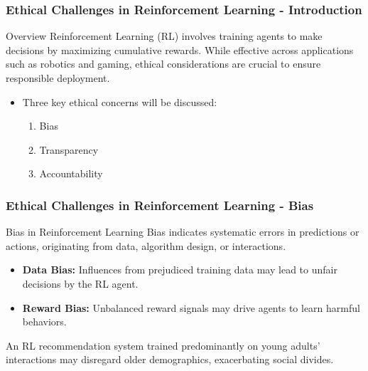 \documentclass[aspectratio=169]{beamer}
\begin{document}
\begin{frame}[fragile]
    \frametitle{Ethical Challenges in Reinforcement Learning - Introduction}
    \begin{block}{Overview}
        Reinforcement Learning (RL) involves training agents to make decisions by maximizing cumulative rewards. While effective across applications such as robotics and gaming, ethical considerations are crucial to ensure responsible deployment.
    \end{block}
    \begin{itemize}
        \item Three key ethical concerns will be discussed:
        \begin{enumerate}
            \item Bias
            \item Transparency
            \item Accountability
        \end{enumerate}
    \end{itemize}
\end{frame}

\begin{frame}[fragile]
    \frametitle{Ethical Challenges in Reinforcement Learning - Bias}
    \begin{block}{Bias in Reinforcement Learning}
        Bias indicates systematic errors in predictions or actions, originating from data, algorithm design, or interactions.
    \end{block}
    \begin{itemize}
        \item \textbf{Data Bias:} Influences from prejudiced training data may lead to unfair decisions by the RL agent.
        \item \textbf{Reward Bias:} Unbalanced reward signals may drive agents to learn harmful behaviors.
    \end{itemize}
    \begin{example}
        An RL recommendation system trained predominantly on young adults' interactions may disregard older demographics, exacerbating social divides.
    \end{example}
\end{frame}
\end{document}
